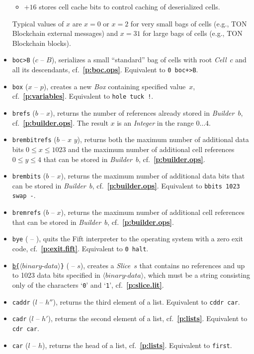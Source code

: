 \documentclass[12pt,oneside]{article}
\def\refpoint#1{{\rm\textbf{\ref{#1}}}}
\let\ptref=\refpoint
\begin{document}
\begin{itemize}
\begin{itemize}
  \item $+16$ stores cell cache bits to control caching of deserialized cells.
  \end{itemize}
Typical values of $x$ are $x=0$ or $x=2$ for very small bags of cells (e.g., TON Blockchain external messages) and $x=31$ for large bags of cells (e.g., TON Blockchain blocks).
\item {\tt boc>B} ($c$ -- $B$), serializes a small ``standard'' bag of cells with root {\em Cell\/}~$c$ and all its descendants, cf.~\ptref{p:boc.ops}. Equivalent to {\tt 0 boc+>B}.
\item {\tt box} ($x$ -- $p$), creates a new {\em Box\/} containing specified value~$x$, cf.~\ptref{p:variables}. Equivalent to {\tt hole tuck !}.
\item {\tt brefs} ($b$ -- $x$), returns the number of references already stored in {\em Builder\/}~$b$, cf.~\ptref{p:builder.ops}. The result $x$ is an {\em Integer\/} in the range $0\dots4$.
\item {\tt brembitrefs} ($b$ -- $x$ $y$), returns both the maximum number of additional data bits $0\leq x\leq 1023$ and the maximum number of additional cell references $0\leq y\leq 4$ that can be stored in {\em Builder\/}~$b$, cf.~\ptref{p:builder.ops}.
\item {\tt brembits} ($b$ -- $x$), returns the maximum number of additional data bits that can be stored in {\em Builder\/}~$b$, cf.~\ptref{p:builder.ops}. Equivalent to {\tt bbits 1023 swap -}.
\item {\tt bremrefs} ($b$ -- $x$), returns the maximum number of additional cell references that can be stored in {\em Builder\/}~$b$, cf.~\ptref{p:builder.ops}.
\item {\tt bye} ( -- ), quits the Fift interpreter to the operating system with a zero exit code, cf.~\ptref{p:exit.fift}. Equivalent to {\tt 0 halt}.
\item {\tt \underline{b\{}$\langle\textit{binary-data}\rangle$\}} ( -- $s$), creates a {\em Slice}~$s$ that contains no references and up to 1023 data bits specified in $\langle\textit{binary-data}\rangle$, which must be a string consisting only of the characters `{\tt 0}' and `{\tt 1}', cf.~\ptref{p:slice.lit}.
\item {\tt caddr} ($l$ -- $h''$), returns the third element of a list. Equivalent to {\tt cddr car}.
\item {\tt cadr} ($l$ -- $h'$), returns the second element of a list, cf.~\ptref{p:lists}. Equivalent to {\tt cdr car}.
\item {\tt car} ($l$ -- $h$), returns the head of a list, cf.~\ptref{p:lists}. Equivalent to {\tt first}.

\end{itemize}
\end{document}
